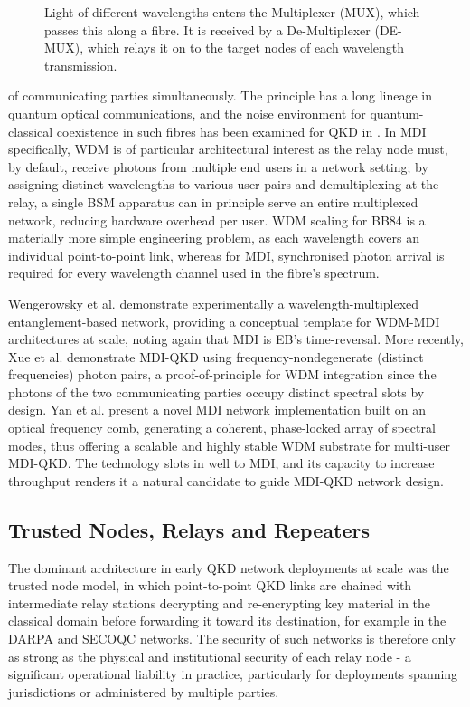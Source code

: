 \documentclass[9pt,technote]{IEEEtran}
\begin{document}
\begin{figure}
    \caption{Light of different wavelengths enters the Multiplexer (MUX), which passes this along a fibre. It is received by a De-Multiplexer (DE-MUX), which relays it on to the target nodes of each wavelength transmission.}
    \label{fig:WDM}
\end{figure}
\noindent of communicating parties simultaneously. The principle has a long lineage in quantum optical communications, and the noise environment for quantum-classical coexistence in such fibres has been examined for QKD in \cite{Peters_2009}. In MDI specifically, WDM is of particular architectural interest as the relay node must, by default, receive photons from multiple end users in a network setting; by assigning distinct wavelengths to various user pairs and demultiplexing at the relay, a single BSM apparatus can in principle serve an entire multiplexed network, reducing hardware overhead per user. WDM scaling for BB84 is a materially more simple engineering problem, as each wavelength covers an individual point-to-point link, whereas for MDI, synchronised photon arrival is required for every wavelength channel used in the fibre's spectrum.

Wengerowsky et al. \cite{Wengerowsky_2018} demonstrate experimentally a wavelength-multiplexed entanglement-based network, providing a conceptual template for WDM-MDI architectures at scale, noting again that MDI is EB's time-reversal. More recently, Xue et al. \cite{Xue2022} demonstrate MDI-QKD using frequency-nondegenerate (distinct frequencies) photon pairs, a proof-of-principle for WDM integration since the photons of the two communicating parties occupy distinct spectral slots by design. Yan et al. \cite{Yan2025} present a novel MDI network implementation built on an optical frequency comb, generating a coherent, phase-locked array of spectral modes, thus offering a scalable and highly stable WDM substrate for multi-user MDI-QKD. The technology slots in well to MDI, and its capacity to increase throughput renders it a natural candidate to guide MDI-QKD network design.

\subsection*{Trusted Nodes, Relays and Repeaters}
The dominant architecture in early QKD network deployments at scale was the trusted node model, in which point-to-point QKD links are chained with intermediate relay stations decrypting and re-encrypting key material in the classical domain before forwarding it toward its destination, for example in the DARPA \cite{Elliott_2002} and SECOQC \cite{Peev_2009} networks. The security of such networks is therefore only as strong as the physical and institutional security of each relay node - a significant operational liability in practice, particularly for deployments spanning jurisdictions or administered by multiple parties.
\end{document}
